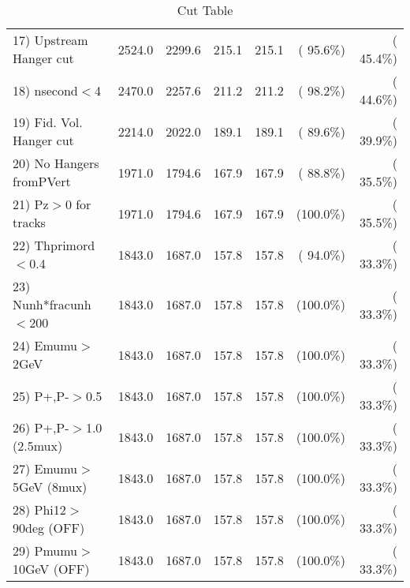 \begin{table}[h!]
\begin{tabular}{||l||r|r|r|r|r|r||}
 17) Upstream Hanger cut  &       2524.0 &       2299.6 &        215.1 &        215.1 & ( 95.6\%) & ( 45.4\%) \\
 18) nsecond$<$4          &       2470.0 &       2257.6 &        211.2 &        211.2 & ( 98.2\%) & ( 44.6\%) \\
 19) Fid. Vol. Hanger cut &       2214.0 &       2022.0 &        189.1 &        189.1 & ( 89.6\%) & ( 39.9\%) \\
 20) No Hangers fromPVert &       1971.0 &       1794.6 &        167.9 &        167.9 & ( 88.8\%) & ( 35.5\%) \\
 21) Pz$>$0 for tracks    &       1971.0 &       1794.6 &        167.9 &        167.9 & (100.0\%) & ( 35.5\%) \\
 22) Thprimord$<$0.4      &       1843.0 &       1687.0 &        157.8 &        157.8 & ( 94.0\%) & ( 33.3\%) \\
 23) Nunh*fracunh$<$200   &       1843.0 &       1687.0 &        157.8 &        157.8 & (100.0\%) & ( 33.3\%) \\
 24) Emumu$>$2GeV         &       1843.0 &       1687.0 &        157.8 &        157.8 & (100.0\%) & ( 33.3\%) \\
 25) P+,P-$>$0.5          &       1843.0 &       1687.0 &        157.8 &        157.8 & (100.0\%) & ( 33.3\%) \\
 26) P+,P-$>$1.0 (2.5mux) &       1843.0 &       1687.0 &        157.8 &        157.8 & (100.0\%) & ( 33.3\%) \\
 27) Emumu$>$5GeV  (8mux) &       1843.0 &       1687.0 &        157.8 &        157.8 & (100.0\%) & ( 33.3\%) \\
 28) Phi12$>$90deg  (OFF) &       1843.0 &       1687.0 &        157.8 &        157.8 & (100.0\%) & ( 33.3\%) \\
 29) Pmumu$>$10GeV  (OFF) &       1843.0 &       1687.0 &        157.8 &        157.8 & (100.0\%) & ( 33.3\%) \\
 \hline
 \hline
 \end{tabular}
 \caption{Cut Table           }
 \label{tab-cutcohjpsi-mumu_anumucc}
 \end{table}
